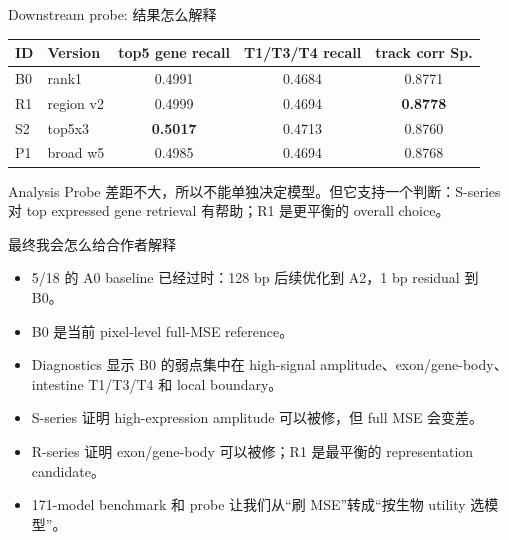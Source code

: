 \documentclass[UTF8,aspectratio=169,10pt]{ctexbeamer}
\begin{document}
\begin{frame}{Downstream probe: 结果怎么解释}
  \centering
  \begin{tabular}{llccc}
    \toprule
    ID & Version & top5 gene recall & T1/T3/T4 recall & track corr Sp. \\
    \midrule
    B0 & rank1 & 0.4991 & 0.4684 & 0.8771 \\
    R1 & region v2 & 0.4999 & 0.4694 & \textbf{0.8778} \\
    S2 & top5x3 & \textbf{0.5017} & 0.4713 & 0.8760 \\
    P1 & broad w5 & 0.4985 & 0.4694 & 0.8768 \\
    \bottomrule
  \end{tabular}

  \vspace{0.8em}
  \begin{block}{Analysis}
    Probe 差距不大，所以不能单独决定模型。但它支持一个判断：S-series 对 top expressed gene retrieval 有帮助；R1 是更平衡的 overall choice。
  \end{block}
\end{frame}

\begin{frame}{最终我会怎么给合作者解释}
  \begin{itemize}
    \item 5/18 的 A0 baseline 已经过时：128 bp 后续优化到 A2，1 bp residual 到 B0。
    \item B0 是当前 pixel-level full-MSE reference。
    \item Diagnostics 显示 B0 的弱点集中在 high-signal amplitude、exon/gene-body、intestine T1/T3/T4 和 local boundary。
    \item S-series 证明 high-expression amplitude 可以被修，但 full MSE 会变差。
    \item R-series 证明 exon/gene-body 可以被修；R1 是最平衡的 representation candidate。
    \item 171-model benchmark 和 probe 让我们从“刷 MSE”转成“按生物 utility 选模型”。
  \end{itemize}
\end{frame}
\end{document}
